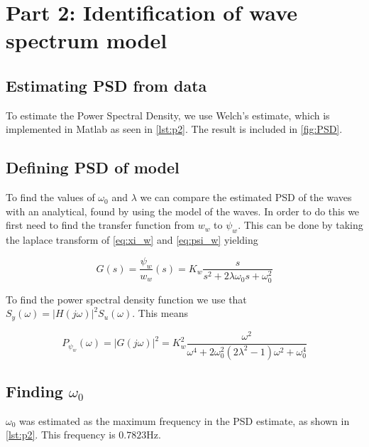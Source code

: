 
\section{Part 2: Identification of wave spectrum model}

\subsection{Estimating PSD from data}


To estimate the Power Spectral Density, we use Welch's estimate, which is implemented in Matlab as seen in \cref{lst:p2}. The result is included in \cref{fig:PSD}.



\subsection{Defining PSD of model}
To find the values of $\omega_0$ and $\lambda$ we can compare the estimated PSD of the waves with an analytical, found by using the model of the waves. In order to do this we first need to find the transfer function from $w_w$ to $\psi_w$. This can be done by taking the laplace transform of \cref{eq:xi_w} and \cref{eq:psi_w} yielding

\begin{equation}
    G(s) = \frac{\psi_w}{w_w}(s) = K_w\frac{s}{s^2+2\lambda\omega_0s+\omega_0^2} \label{eq:G(s)}
\end{equation}

To find the power spectral density function we use that $S_y(\omega) = |H(j\omega)|^2S_u(\omega)$. This means

\begin{equation}
    P_{\psi_w}(\omega) = |G(j\omega)|^2 = K_w^2\frac{\omega^2}{\omega^4+2\omega_0^2(2\lambda^2-1)\omega^2+\omega_0^4} \label{eq:PSD}
\end{equation}


\subsection{Finding $\omega_0$}

$\omega_0$ was estimated as the maximum frequency in the PSD estimate, as shown in \cref{lst:p2}. This frequency is $0.7823\si{\Hz}$.

